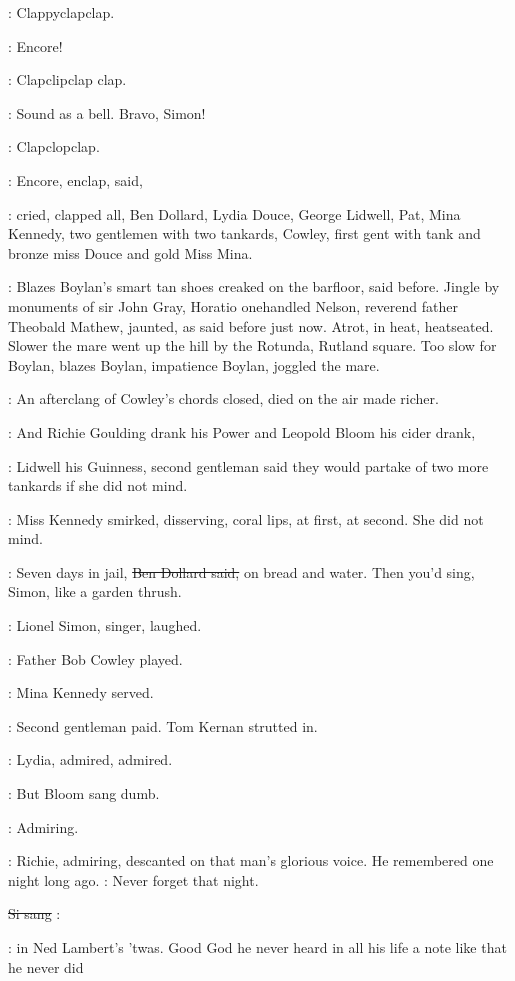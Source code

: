 :
Clappyclapclap.

\cowley:
Encore!

:
Clapclipclap clap.

\lenehan:
Sound as a bell.
Bravo,
Simon!

:
Clapclopclap.

:
Encore,
enclap,
said,

:
cried,
clapped all,
Ben Dollard,
Lydia Douce,
George
Lidwell,
Pat,
Mina Kennedy,
two gentlemen with two tankards,
Cowley,
first gent with tank and bronze miss Douce
and gold Miss Mina.

:
Blazes Boylan's smart tan shoes creaked on the barfloor,
said before.
Jingle by monuments of sir John Gray,
Horatio onehandled Nelson,
reverend father Theobald Mathew,
jaunted,
as said before just now.
Atrot,
in heat,
heatseated.
Slower the mare
went up the hill by the Rotunda,
Rutland square.
Too slow for Boylan,
blazes Boylan,
impatience Boylan,
joggled the mare.

:
An afterclang of Cowley's chords closed,
died on the air
made richer.

:
And Richie Goulding drank his Power and Leopold Bloom his cider
drank,

:
Lidwell his Guinness,
second gentleman said they would partake of
two more tankards if she did not mind.

:
Miss Kennedy smirked,
disserving,
coral lips,
at first,
at second.
She did not mind.

\dollard:
Seven days in jail,
\sout{Ben Dollard said,}
on bread and water.
Then you'd
sing,
Simon,
like a garden thrush.

:
Lionel Simon,
singer,
laughed.

:
Father Bob Cowley played.

:
Mina Kennedy served.

:
Second gentleman paid.
Tom Kernan strutted in.

:
Lydia,
admired,
admired.

:
But Bloom sang dumb.

:
Admiring.

:
Richie,
admiring,
descanted on that man's glorious voice.
He
remembered one night long ago.
\BloomInt:
Never forget that night.

\sout{Si sang}
\simon:

\BloomInt:
in Ned Lambert's 'twas.
Good God he never heard in all his
life a note like that he never did

